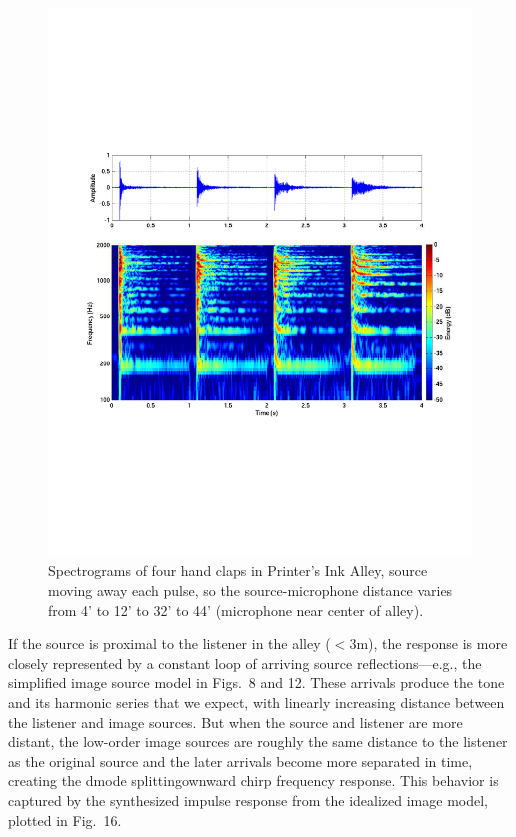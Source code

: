 \documentclass{aes137}
\begin{document}
\begin{figure}[h!] \centering \includegraphics[width=\linewidth]{images/P12C_irsg_cropped.pdf} \caption{Spectrograms of four hand claps in Printer's Ink Alley, source moving away each pulse, so the source-microphone distance varies from 4' to 12' to 32' to 44' (microphone near center of alley).} \end{figure}

If the source is proximal to the listener in the alley ($<3$m), the response is more closely represented by a constant loop of arriving source reflections---e.g., the simplified image source model in Figs.~8 and 12. These arrivals produce the tone and its harmonic series that we expect, with linearly increasing distance between the listener and image sources. But when the source and listener are more distant, the low-order image sources are roughly the same distance to the listener as the original source and the later arrivals become more separated in time, creating the dmode splittingownward chirp frequency response. This behavior is captured by the synthesized impulse response from the idealized image model, plotted in Fig.~16.
\end{document}
